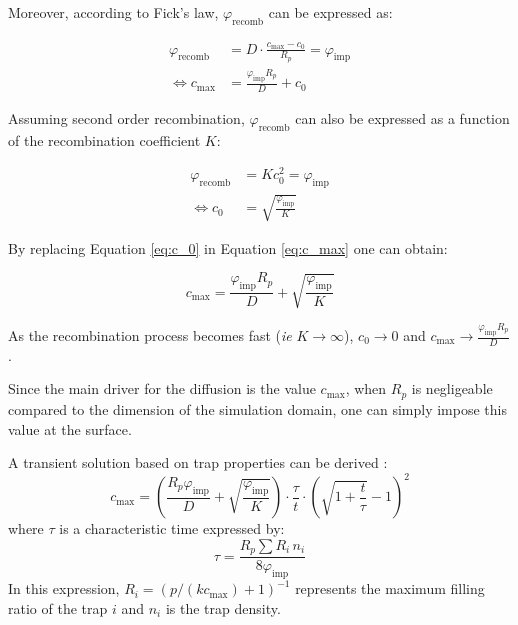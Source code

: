 Moreover, according to Fick's law, $\varphi_\mathrm{recomb}$ can be expressed as:

\begin{eqnarray}
    \varphi_\mathrm{recomb} &= D \cdot \frac{c_\mathrm{max}-c_{0}}{R_{p}} = \varphi_\mathrm{imp}\\
    \Leftrightarrow c_\mathrm{max} &= \frac{\varphi_\mathrm{imp} R_{p}}{D}+ c_0
    \label{eq:c_max}
\end{eqnarray}

Assuming second order recombination, $\varphi_\mathrm{recomb}$ can also be expressed as a function of the recombination coefficient $K$:

\begin{eqnarray}
    \varphi_\mathrm{recomb} &= K c_{0}^{2} = \varphi_\mathrm{imp}\\
    \Leftrightarrow c_{0} &= \sqrt{\frac{\varphi_\mathrm{imp}}{K}}
    \label{eq:c_0}
\end{eqnarray}

By replacing Equation \ref{eq:c_0} in Equation \ref{eq:c_max} one can obtain:

\begin{equation}
    c_\mathrm{max} = \frac{\varphi_\mathrm{imp} R_{p}}{D}+\sqrt{\frac{\varphi_\mathrm{imp}}{K}}
\end{equation}

As the recombination process becomes fast (\textit{ie} $K \rightarrow \infty$), $c_0 \rightarrow 0$ and $c_\mathrm{max} \rightarrow \frac{\varphi_\mathrm{imp} R_{p}}{D}$.

Since the main driver for the diffusion is the value $c_\mathrm{max}$, when $R_p$ is negligeable compared to the dimension of the simulation domain, one can simply impose this value at the surface.

A transient solution based on trap properties can be derived :
\begin{equation}
    c_\mathrm{max}=\left( \frac{R_p \varphi_\mathrm{imp}}{D} + \sqrt{\frac{\varphi_\mathrm{imp}}{K}} \right) \cdot \frac{\tau}{t} \cdot\left(\sqrt{1+\frac{t}{\tau}}-1\right)^2
\end{equation}
where $\tau$ is a characteristic time expressed by:
\begin{equation}
    \tau = \frac{R_p \sum R_i \, n_i}{8 \varphi_\mathrm{imp}}
\end{equation}
In this expression, $R_i = (p / (k c_\mathrm{max}) + 1)^{-1}$ represents the maximum filling ratio of the trap $i$ and $n_i$ is the trap density.

